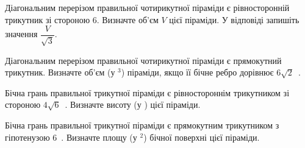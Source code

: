 \documentclass[12pt]{article}
\begin{document}
\begin{samepage}
\par{}
\end{samepage}


\begin{samepage}
\noindent\zadnum Діагональним перерізом правильної чотирикутної піраміди є рівносторонній трикутник зі стороною 6. Визначте об’єм $V$ цієї піраміди. У відповіді запишіть значення $\dfrac{V}{\sqrt{3}}$. 

\nmtnobreak
\nopagebreak\nbvspace{0.5cm}
\nmtAnswerBox
\par{}
\end{samepage}

\begin{samepage}
\noindent\zadnum Діагональним перерізом правильної чотирикутної піраміди є прямокутний трикутник. Визначте об’єм (у $^3$) піраміди, якщо її бічне ребро дорівнює $6\sqrt{2}$~. 

\nmtnobreak
\nopagebreak\nbvspace{0.5cm}
\nmtAnswerBox
\par{}
\end{samepage}

\begin{samepage}
\noindent\zadnum Бічна грань правильної трикутної піраміди є рівностороннім трикутником зі стороною $4\sqrt{6}$~. Визначте висоту (у ) цієї піраміди. 

\nmtnobreak
\nopagebreak\nbvspace{0.5cm}
\nmtAnswerBox
\par{}
\end{samepage}

\begin{samepage}
\noindent\zadnum Бічна грань правильної трикутної піраміди є прямокутним трикутником з гіпотенузою 6~. Визначте площу (у $^2$) бічної поверхні цієї піраміди. 

\nmtnobreak
\nopagebreak\nbvspace{0.5cm}
\nmtAnswerBox
\par{}
\end{samepage}
\end{document}
